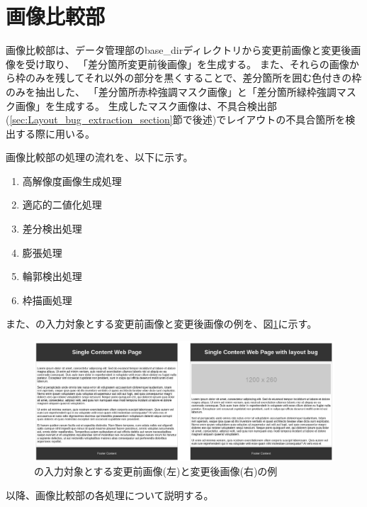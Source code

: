 \section{画像比較部}\label{sec:Difference_extraction_section}
画像比較部は、データ管理部のbase\_dirディレクトリから変更前画像と変更後画像を受け取り、
「差分箇所変更前後画像」を生成する。
また、それらの画像から枠のみを残してそれ以外の部分を黒くすることで、差分箇所を囲む色付きの枠のみを抽出した、
「差分箇所赤枠強調マスク画像」と「差分箇所緑枠強調マスク画像」を生成する。
生成したマスク画像は、不具合検出部(\ref{sec:Layout_bug_extraction_section}節で後述)でレイアウトの不具合箇所を検出する際に用いる。
\par
画像比較部の処理の流れを、以下に示す。
\begin{enumerate}
    \item 高解像度画像生成処理
    \item 適応的二値化処理
    \item 差分検出処理
    \item 膨張処理
    \item 輪郭検出処理
    \item 枠描画処理
\end{enumerate}
また、\toolName の入力対象とする変更前画像と変更後画像の例を、図\ref{fig: img_original_bf_af}に示す。
\begin{figure}[tp]
    \begin{center}
        \includegraphics[width=1.0\columnwidth]{image/4_img_original_bf_af.png}
        \caption{\toolName の入力対象とする変更前画像(左)と変更後画像(右)の例}
        \label{fig: img_original_bf_af}
    \end{center}
\end{figure}
以降、画像比較部の各処理について説明する。

